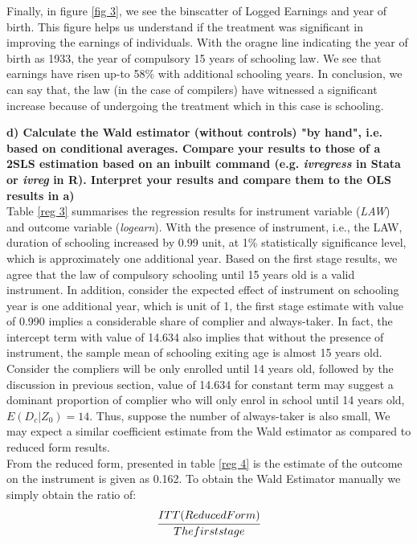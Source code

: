 \documentclass[a4paper,12pt,oneside,English]{article}
\begin{document}
Finally, in figure \ref{fig 3}, we see the binscatter of Logged Earnings and year of birth. This figure helps us understand if the treatment was significant in improving the earnings of individuals. With the oragne line indicating the year of birth as 1933, the year of compulsory 15 years of schooling law. We see that earnings have risen up-to 58\% with additional schooling years. In conclusion, we can say that, the law (in the case of compilers) have witnessed a significant increase because of undergoing the treatment which in this case is schooling.

\newpage
\textbf{d) Calculate the Wald estimator (without controls) "by hand", i.e. based on conditional averages. Compare your results to those of a 2SLS estimation based on an inbuilt command (e.g. \textit{ivregress} in Stata or \textit{ivreg} in R). Interpret your results and compare them to the OLS results in a)}\\

Table \ref{reg 3} summarises the regression results for instrument variable (\textit{LAW}) and outcome variable (\textit{logearn}). With the presence of instrument, i.e., the LAW, duration of schooling increased by 0.99 unit, at 1\% statistically significance level, which is approximately one additional year. Based on the first stage results, we agree that the law of compulsory schooling until 15 years old is a valid instrument. In addition, consider the expected effect of instrument on schooling year is one additional year, which is unit of 1, the first stage estimate with value of 0.990 implies a considerable share of complier and always-taker. In fact, the intercept term with value of 14.634 also implies that without the presence of instrument, the sample mean of schooling exiting age is almost 15 years old. Consider the compliers will be only enrolled until 14 years old, followed by the discussion in previous section, value of 14.634 for constant term may suggest a dominant proportion of complier who will only enrol in school until 14 years old, $E(D_c|Z_0)=14$. Thus, suppose the number of always-taker is also small, We may expect a similar coefficient estimate from the Wald estimator as compared to reduced form results. \\ 

From the reduced form, presented in table \ref{reg 4} is the estimate of the outcome on the instrument is given as 0.162. To obtain the Wald Estimator manually we simply obtain the ratio of: 
\\
\begin{align*}
       \cfrac{ITT(Reduced Form)}{The first stage}
\end{align*}
 
\end{document}
